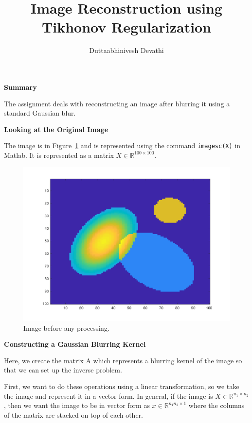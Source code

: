 \documentclass{article}
\title{Image Reconstruction using Tikhonov Regularization}
\author{Duttaabhinivesh Devathi}
\begin{document}
\maketitle

\bigskip
{\Large {\bf Summary}}
\bigskip

The assignment deals with reconstructing an image after blurring it using a standard Gaussian blur.

\bigskip
{\Large {\bf Looking at the Original Image}}
\bigskip

The image is in Figure~\ref{fig:Figure 1} and is represented using the command \texttt{imagesc(X)} in Matlab. It is represented as a matrix $X \in \mathbb{R}^{100\times100}$.

\begin{figure}[h!]
\centerline{
\includegraphics[width= 14cm]{TrueTarget.png}
}
\caption{\label{fig:Figure 1} Image before any processing.}
\end{figure}

\newpage
{\Large {\bf Constructing a Gaussian Blurring Kernel}}
\bigskip

Here, we create the matrix A which represents a blurring kernel of the image so that we can set up the inverse problem. 

First, we want to do these operations using a linear transformation, so we take the image and represent it in a vector form. In general, if the image is $X \in \mathbb{R}^{n_{1}\times n_{2}}$, then we want the image to be in vector form as $x \in \mathbb{R}^{n_{1}n_{2} \times 1}$ where the columns of the matrix are stacked on top of each other.
\end{document}
